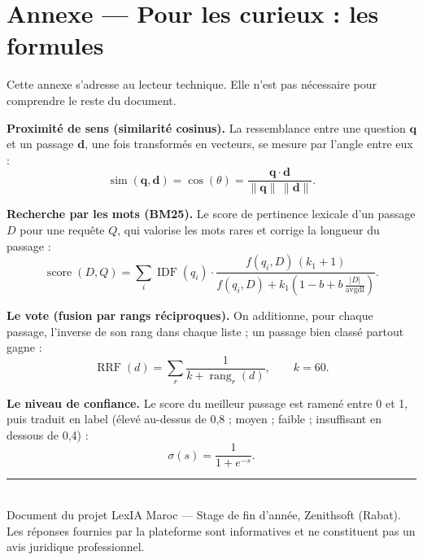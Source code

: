 \documentclass[11pt,a4paper]{article}
\begin{document}
\section*{\color{navy}Annexe --- Pour les curieux : les formules}
{\small\color{muted} Cette annexe s'adresse au lecteur technique. Elle n'est pas nécessaire pour
comprendre le reste du document.}
\vspace{6pt}

\noindent\textbf{\color{navy}Proximité de sens (similarité cosinus).} La ressemblance entre une
question \(\mathbf{q}\) et un passage \(\mathbf{d}\), une fois transformés en vecteurs, se mesure par
l'angle entre eux :
\[
\operatorname{sim}(\mathbf{q},\mathbf{d}) = \cos(\theta)
= \frac{\mathbf{q}\cdot\mathbf{d}}{\lVert\mathbf{q}\rVert\,\lVert\mathbf{d}\rVert}.
\]

\noindent\textbf{\color{navy}Recherche par les mots (BM25).} Le score de pertinence lexicale d'un
passage \(D\) pour une requête \(Q\), qui valorise les mots rares et corrige la longueur du passage :
\[
\operatorname{score}(D,Q) = \sum_{i} \operatorname{IDF}(q_i)\cdot
\frac{f(q_i,D)\,(k_1+1)}{f(q_i,D) + k_1\!\left(1 - b + b\,\frac{\lvert D\rvert}{\text{avgdl}}\right)}.
\]

\noindent\textbf{\color{navy}Le vote (fusion par rangs réciproques).} On additionne, pour chaque
passage, l'inverse de son rang dans chaque liste ; un passage bien classé partout gagne :
\[
\operatorname{RRF}(d) = \sum_{r} \frac{1}{k + \operatorname{rang}_r(d)}, \qquad k = 60.
\]

\noindent\textbf{\color{navy}Le niveau de confiance.} Le score du meilleur passage est ramené entre
0 et 1, puis traduit en label (élevé au-dessus de 0,8 ; moyen ; faible ; insuffisant en dessous de
0,4) :
\[
\sigma(s) = \frac{1}{1 + e^{-s}}.
\]

\vspace{12pt}
\noindent\textcolor{border}{\rule{\textwidth}{0.5pt}}\\[4pt]
{\small\color{muted} Document du projet LexIA Maroc --- Stage de fin d'année, Zenithsoft (Rabat). Les
réponses fournies par la plateforme sont informatives et ne constituent pas un avis juridique
professionnel.}
\end{document}
